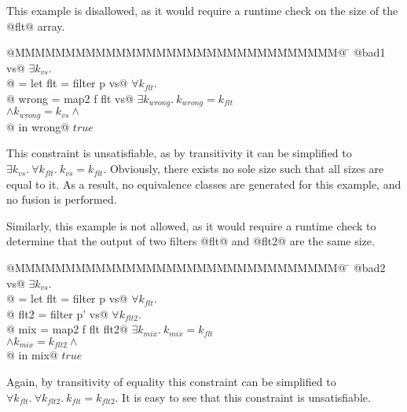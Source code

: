 This example is disallowed, as it would require a runtime check on the size of the @flt@ array.
\begin{tabbing}
@MMMMMMMMMMMMMMMMMMMMMMMMMMMMMMMM@  \= \kill
@bad1 vs@                           \> $\exists k_{vs}.$ \\
@ = let flt   = filter p vs@        \> $\forall k_{flt}.$ \\
@       wrong = map2   f flt vs@    \> $\exists k_{wrong}.\ k_{wrong} = k_{flt}$ \\
                                    \> $\wedge k_{wrong} = k_{vs} \wedge$ \\
@   in  wrong@                      \> $true$
\end{tabbing}
This constraint is unsatisfiable, as by transitivity it can be simplified to $\exists k_{vs}.\ \forall k_{flt}.\ k_{vs} = k_{flt}$.
Obviously, there exists no sole size such that all sizes are equal to it.
As a result, no equivalence classes are generated for this example, and no fusion is performed.


Similarly, this example is not allowed, as it would require a runtime check to determine that the output of two filters @flt@ and @flt2@ are the same size.
\begin{tabbing}
@MMMMMMMMMMMMMMMMMMMMMMMMMMMMMMMM@  \= \kill
@bad2 vs@                           \> $\exists k_{vs}.$ \\
@ = let flt  = filter p  vs@        \> $\forall k_{flt}.$ \\
@       flt2 = filter p' vs@        \> $\forall k_{flt2}.$ \\
@       mix  = map2   f  flt flt2@  \> $\exists k_{mix}.\ k_{mix} = k_{flt}$ \\
                                    \> $\wedge k_{mix} = k_{flt2} \wedge$ \\
@   in  mix@                        \> $true$                               \\
\end{tabbing}
Again, by transitivity of equality this constraint can be simplified to $\forall k_{flt}.\ \forall k_{flt2}.\ k_{flt} = k_{flt2}$.
It is easy to see that this constraint is unsatisfiable.


